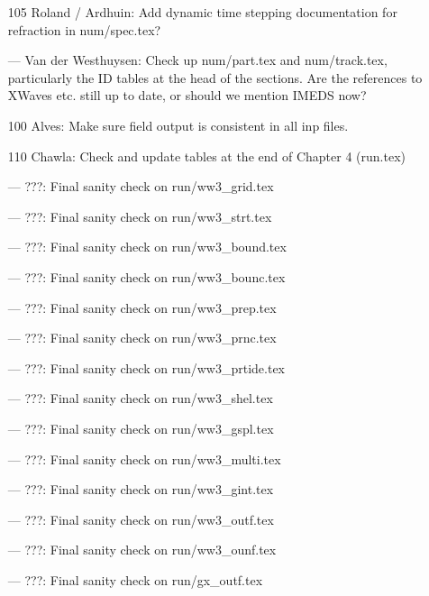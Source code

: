 \begin{itemize}
\item[105] Roland / Ardhuin: Add dynamic time stepping documentation for
  refraction in num/spec.tex?

\item[---] Van der Westhuysen: Check up num/part.tex and num/track.tex,
  particularly the ID tables at the head of the sections. Are the references to
  XWaves etc. still up to date, or should we mention IMEDS now?

\item[100] Alves: Make sure field output is consistent in all inp files.

\item[110] Chawla: Check and update tables at the end of Chapter 4 (run.tex)

\item[---] ???: Final sanity check on run/ww3\_grid.tex

\item[---] ???: Final sanity check on run/ww3\_strt.tex

\item[---] ???: Final sanity check on run/ww3\_bound.tex

\item[---] ???: Final sanity check on run/ww3\_bounc.tex

\item[---] ???: Final sanity check on run/ww3\_prep.tex

\item[---] ???: Final sanity check on run/ww3\_prnc.tex

\item[---] ???: Final sanity check on run/ww3\_prtide.tex

\item[---] ???: Final sanity check on run/ww3\_shel.tex

\item[---] ???: Final sanity check on run/ww3\_gspl.tex

\item[---] ???: Final sanity check on run/ww3\_multi.tex

\item[---] ???: Final sanity check on run/ww3\_gint.tex

\item[---] ???: Final sanity check on run/ww3\_outf.tex

\item[---] ???: Final sanity check on run/ww3\_ounf.tex

\item[---] ???: Final sanity check on run/gx\_outf.tex


\end{itemize}
